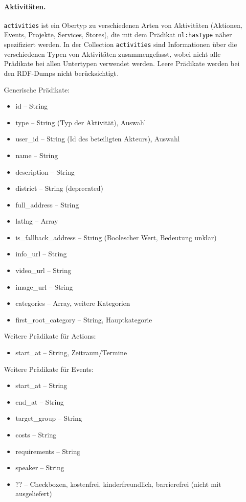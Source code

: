 \documentclass[a4paper,11pt]{article}
\begin{document}
\paragraph{Aktivitäten.}
\texttt{activities} ist ein Obertyp zu verschiedenen Arten von Aktivitäten
(Aktionen, Events, Projekte, Services, Stores), die mit dem Prädikat
\texttt{nl:hasType} näher spezifiziert werden.  In der Collection
\texttt{activities} sind Informationen über die verschiedenen Typen von
Aktivitäten zusammengefasst, wobei nicht alle Prädikate bei allen Untertypen
verwendet werden. Leere Prädikate werden bei den RDF-Dumps nicht
berücksichtigt.

Generische Prädikate:
\begin{itemize}\itemsep0pt
  \item id -- String
  \item type -- String (Typ der Aktivität), Auswahl
  \item user\_id -- String (Id des beteiligten Akteurs), Auswahl
  \item name -- String
  \item description -- String
  \item district -- String (deprecated)
  \item full\_address -- String
  \item latlng -- Array
  \item is\_fallback\_address -- String (Boolescher Wert, Bedeutung unklar)
  \item info\_url -- String
  \item video\_url -- String
  \item image\_url -- String
  \item categories -- Array, weitere Kategorien
  \item first\_root\_category -- String, Hauptkategorie
\end{itemize}

Weitere Prädikate für Actions:
\begin{itemize}\itemsep0pt
  \item start\_at -- String, Zeitraum/Termine
\end{itemize}

Weitere Prädikate für Events:
\begin{itemize}\itemsep0pt
  \item start\_at -- String
  \item end\_at -- String
  \item target\_group -- String
  \item costs -- String
  \item requirements -- String
  \item speaker -- String
  \item ?? -- Checkboxen, kostenfrei, kinderfreundlich, barrierefrei (nicht
    mit ausgeliefert) 
\end{itemize}
\end{document}
